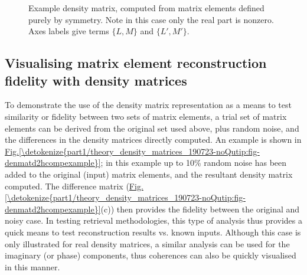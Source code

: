 \documentclass[letterpaper,table,10pt,english]{jupyterBook}
\begin{document}
\begin{figure}[htbp]
\centering
\capstart

\noindent{}
\caption{Example density matrix, computed from matrix elements defined purely by  symmetry. Note in this case only the real part is non\sphinxhyphen{}zero. Axes labels give terms \(\{L,M\}\) and \(\{L',M'\}\).}\label{\detokenize{part1/theory_density_matrices_190723-noQutip:fig-denmatd2hrealonly}}\end{figure}


\subsection{Visualising matrix element reconstruction fidelity with density matrices}
\label{\detokenize{part1/theory_density_matrices_190723-noQutip:visualising-matrix-element-reconstruction-fidelity-with-density-matrices}}
\sphinxAtStartPar
To demonstrate the use of the density matrix representation as a means to test similarity or fidelity between two sets of matrix elements, a trial set of matrix elements can be derived from the original set used above, plus random noise, and the differences in the density matrices directly computed. An example is shown in \hyperref[\detokenize{part1/theory_density_matrices_190723-noQutip:fig-denmatd2hcompexample}]{Fig.\@ \ref{\detokenize{part1/theory_density_matrices_190723-noQutip:fig-denmatd2hcompexample}}}; in this example up to 10\% random noise has been added to the original (input) matrix elements, and the resultant density matrix computed. The difference matrix (\hyperref[\detokenize{part1/theory_density_matrices_190723-noQutip:fig-denmatd2hcompexample}]{Fig.\@ \ref{\detokenize{part1/theory_density_matrices_190723-noQutip:fig-denmatd2hcompexample}}}(c)) then provides the fidelity between the original and noisy case. In testing retrieval methodologies, this type of analysis thus provides a quick means to test reconstruction results vs. known inputs. Although this case is only illustrated for real density matrices, a similar analysis can be used for the imaginary (or phase) components, thus coherences can also be quickly visualised in this manner.
\end{document}
